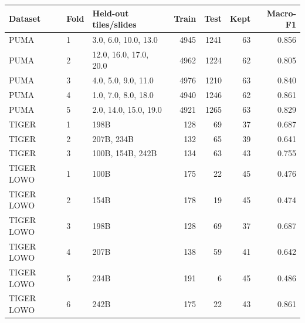 \begin{tabular}{llp{5.0cm}rrrr}
\toprule
Dataset & Fold & Held-out tiles/slides & Train & Test & Kept & Macro-F1 \\
\midrule
PUMA & 1 & 3.0, 6.0, 10.0, 13.0 & 4945 & 1241 & 63 & 0.856 \\
PUMA & 2 & 12.0, 16.0, 17.0, 20.0 & 4962 & 1224 & 62 & 0.805 \\
PUMA & 3 & 4.0, 5.0, 9.0, 11.0 & 4976 & 1210 & 63 & 0.840 \\
PUMA & 4 & 1.0, 7.0, 8.0, 18.0 & 4940 & 1246 & 62 & 0.861 \\
PUMA & 5 & 2.0, 14.0, 15.0, 19.0 & 4921 & 1265 & 63 & 0.829 \\
TIGER & 1 & 198B & 128 & 69 & 37 & 0.687 \\
TIGER & 2 & 207B, 234B & 132 & 65 & 39 & 0.641 \\
TIGER & 3 & 100B, 154B, 242B & 134 & 63 & 43 & 0.755 \\
TIGER LOWO & 1 & 100B & 175 & 22 & 45 & 0.476 \\
TIGER LOWO & 2 & 154B & 178 & 19 & 45 & 0.474 \\
TIGER LOWO & 3 & 198B & 128 & 69 & 37 & 0.687 \\
TIGER LOWO & 4 & 207B & 138 & 59 & 41 & 0.642 \\
TIGER LOWO & 5 & 234B & 191 & 6 & 45 & 0.486 \\
TIGER LOWO & 6 & 242B & 175 & 22 & 43 & 0.861 \\
\bottomrule
\end{tabular}
